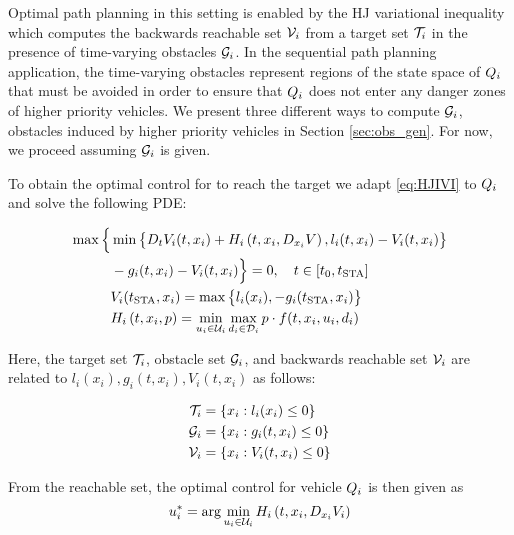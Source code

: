 Optimal path planning in this setting is enabled by the HJ variational inequality which computes the backwards reachable set $\mathcal{V}_i$ from a target set $\mathcal{T}_i$ in the presence of time-varying obstacles $\mathcal{G}_i$. In the sequential path planning application, the time-varying obstacles represent regions of the state space of $Q_i$ that must be avoided in order to ensure that $Q_i$ does not enter any danger zones of higher priority vehicles. We present three different ways to compute $\mathcal{G}_i$, obstacles induced by higher priority vehicles in Section \ref{sec:obs_gen}. For now, we proceed assuming $\mathcal{G}_i$ is given.

To obtain the optimal control for to reach the target we adapt \eqref{eq:HJIVI} to $Q_i$ and solve the following PDE:

\begin{equation}
\label{eq:HJIVI_i}
\begin{aligned}
\max\Big\{&\min\big\{D_t V_i(t, x_i) + H_i\left(t, x_i, D_{x_i} V\right), l_i(t, x_i) - V_i(t, x_i)\big\}\\
& -g_i(t, x_i) - V_i(t, x_i)\Big\} = 0, \quad t \in [t_0, t_\text{STA}]\\
&V_i(t_\text{STA}, x_i) = \max\big\{l_i(x_i), -g_i(t_\text{STA}, x_i)\big\} \\
&H_i\left(t, x_i, p\right) = \min_{u_i \in \mathcal{U}_i} \max_{d_i \in \mathcal{D}_i} p \cdot f(t, x_i, u_i, d_i)
\end{aligned}
\end{equation}

Here, the target set $\mathcal{T}_i$, obstacle set $\mathcal{G}_i$, and backwards reachable set $\mathcal{V}_i$ are related to $l_i(x_i), g_i(t, x_i), V_i(t, x_i)$ as follows:

\begin{equation}
\begin{aligned}
\mathcal{T}_i &= \{x_i: l_i(x_i) \le 0\} \\
\mathcal{G}_i &= \{x_i: g_i(t, x_i) \le 0\} \\
\mathcal{V}_i &= \{x_i: V_i(t, x_i) \le 0\}
\end{aligned}
\end{equation}

From the reachable set, the optimal control for vehicle $Q_i$ is then given as
\begin{equation}
\label{eq:opt_ctrl_i}
u_i^* = \arg \min_{u_i \in \mathcal{U}_i} H_i\left(t, x_i, D_{x_i} V_i\right)
\end{equation}